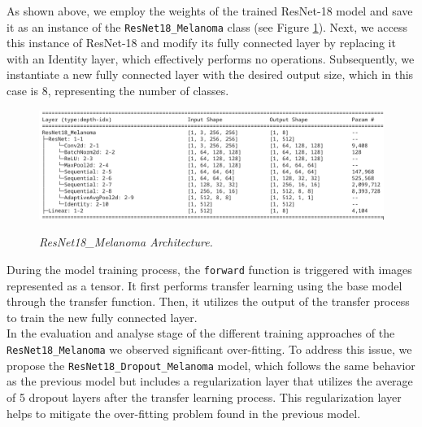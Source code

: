 As shown above, we employ the weights of the trained ResNet-18 model and save
it as an instance of the \texttt{ResNet18\_Melanoma} class (see Figure
\ref{fig:resnet-18-melanoma-arch}). Next, we access this instance of ResNet-18
and modify its fully connected layer by replacing it with an Identity layer,
which effectively performs no operations. Subsequently, we instantiate a new
fully connected layer with the desired output size, which in this case is 8,
representing the number of classes.

\begin{figure}[H]
  \centering
  \includegraphics[width=\textwidth]{imatges/methodological_contribution/ResNet18_Melanoma.png}
  \caption[ResNet18\_Melanoma Architecture]{\textit{ResNet18\_Melanoma Architecture. }}
  {\label{fig:resnet-18-melanoma-arch}}
\end{figure}

During the model training process, the {\tt forward} function is triggered with
images represented as a tensor. It first performs transfer learning using the
base model through the transfer function. Then, it utilizes the output of the
transfer process to train the new fully connected layer. \\

In the evaluation and analyse stage of the different training approaches of the
{\tt ResNet18\_Melanoma} we observed significant over-fitting. To address this
issue, we propose the {\tt ResNet18\_Dropout\_Melanoma} model, which follows
the same behavior as the previous model but includes a regularization layer
that utilizes the average of 5 dropout layers after the transfer learning
process. This regularization layer helps to mitigate the over-fitting problem
found in the previous model.

